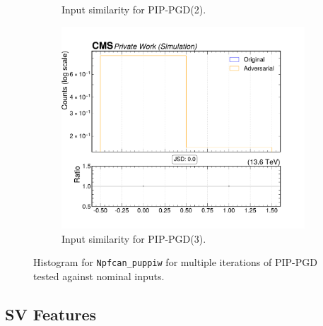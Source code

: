 \begin{figure}[htbp]
\begin{subfigure}[t]{0.32\textwidth}
    \caption*{Input similarity for PIP-PGD(2).}
  \end{subfigure}\hfill
  \begin{subfigure}[t]{0.32\textwidth}
    \includegraphics[width=\linewidth]{media/output/features/compare/combined_it_3/cmp_npf_arr_Npfcan_puppiw.pdf}
    \caption*{Input similarity for PIP-PGD(3).}
  \end{subfigure}

  \caption*{Histogram for \texttt{Npfcan\_puppiw} for multiple iterations of PIP-PGD tested against nominal inputs.}
  \label{fig:combined_input_Npfcan_puppiw}
\end{figure}


\newpage
\subsection*{SV Features}

